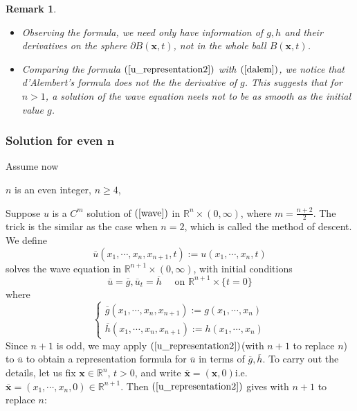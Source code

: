 \documentclass[10pt]{article}
\def\rr{{\mathbb R}}
\def\vc{{\mathbf x}}
\def\so{{\overline u}}
\newtheorem{remark}{Remark}[section]
\begin{document}
\begin{remark}
    \begin{itemize}
        \item [(i)] Observing the formula, we need only have information of $g,h$ and their derivatives on the sphere $\partial B(\vc,t)$, not in the whole ball $B(\vc,t)$.
        \item [(ii)] Comparing the formula $(\ref{u_representation2})$ with $(\ref{dalem})$, we notice that d'Alembert's formula does not the the derivative of $g$. This suggests that for $n>1$, a solution of the wave equation neets not to be as smooth as the initial value $g$.
    \end{itemize}
\end{remark}
\subsubsection{Solution for even $\mathbf{n}$}
Assume now 
\begin{center}
    $n$ is an even integer, $n\geq 4$,
\end{center}
Suppose $u$ is a $C^m$ solution of $(\ref{wave})$ in $\rr^n\times (0,\infty)$, where $m=\frac{n+2}{2}$. The trick is the similar as the case when $n=2$, which is called the method of descent. We define
\begin{equation}
    \label{lineu}
    \so(x_1,\cdots,x_n,x_{n+1},t) := u(x_1,\cdots,x_n,t)
\end{equation}
solves the wave equation in $\rr^{n+1}\times (0,\infty)$, with initial conditions
\begin{equation*}
    \so = \overline{g},\so_t = \overline{h}\quad \text{ on } \rr^{n+1}\times \{t=0\}
\end{equation*}
where
\begin{equation}
    \label{initial_condition}
    \begin{cases}
        \overline{g}(x_1,\cdots,x_n,x_{n+1}) := g(x_1,\cdots,x_n)\\
        \overline{h}(x_1,\cdots,x_n,x_{n+1}) := h(x_1,\cdots,x_n)
    \end{cases}
\end{equation}
Since $n+1$ is odd, we may apply $(\ref{u_representation2})$(with $n+1$ to replace $n$) to $\so$ to obtain a representation formula for $\so$ in terms of $\overline{g},\overline{h}$. To carry out the details, let us fix $\vc \in \rr^{n}$, $t>0$, and write $\overline{\vc} = (\vc,0)$i.e. $\overline{\vc} = (x_1,\cdots,x_n,0)\in \rr^{n+1}$. Then $(\ref{u_representation2})$ gives with $n+1$ to replace $n$:
\end{document}
